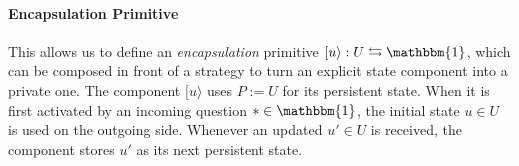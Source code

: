 \documentclass[acmsmall,screen,review,anonymous,nonacm]{acmart}
\newcommand{\kw}[1]{\ensuremath{ \mathsf{#1} }}
\newcommand{\lensarrow}{\leftrightarrows}
\begin{document}
%

\paragraph{Encapsulation Primitive} %

This allows us to define an \emph{encapsulation} primitive
$[ u \rangle : U \lensarrow \mathbbm{1}$,
which can be composed in front of a strategy
to turn an explicit state component into a private one.
The component $[u\rangle$ uses $P := U$ for its persistent state.
When it is first activated
by an incoming question $* \in \mathbbm{1}$,
the initial state $u \in U$ is used on the outgoing side.
Whenever an updated $u' \in U$ is received,
the component stores $u'$ as its next persistent state.



\end{document}
